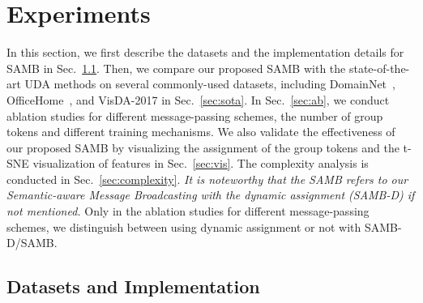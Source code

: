 \documentclass[journal]{IEEEtran}
\begin{document}
\section{Experiments}
\label{sec:experiments}
In this section, we first describe the datasets and the implementation details for SAMB in Sec.~\ref{sec:data_imp}. Then, we compare our proposed SAMB with the state-of-the-art UDA methods on several commonly-used datasets, including DomainNet~\cite{peng2019momentDomainNet}, OfficeHome~\cite{venkateswara2017deepOffice-Home}, and VisDA-2017 in Sec.~\ref{sec:sota}. In Sec.~\ref{sec:ab}, we conduct ablation studies for different message-passing schemes, the number of group tokens and different training mechanisms. We also validate the effectiveness of our proposed SAMB by visualizing the assignment of the group tokens and the t-SNE visualization of features in Sec.~\ref{sec:vis}. The complexity analysis is conducted in Sec.~\ref{sec:complexity}. \textit{It is noteworthy that the SAMB refers to our Semantic-aware Message Broadcasting with the dynamic assignment (SAMB-D) if not mentioned.} Only in the ablation studies for different message-passing schemes, we distinguish between using dynamic assignment or not with SAMB-D/SAMB.
\subsection{Datasets and Implementation}
\label{sec:data_imp}
\end{document}
